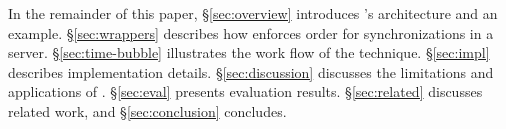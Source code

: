 In the remainder of this paper, \S\ref{sec:overview} introduces \xxx's 
architecture and an example. \S\ref{sec:wrappers} describes how \xxx enforces 
order for synchronizations in a server. \S\ref{sec:time-bubble} illustrates the 
work flow of the \timealgo technique. \S\ref{sec:impl} describes implementation 
details. \S\ref{sec:discussion} discusses the limitations and 
applications of \xxx. \S\ref{sec:eval} presents evaluation results. 
\S\ref{sec:related} discusses related work, and \S\ref{sec:conclusion} 
concludes.



























